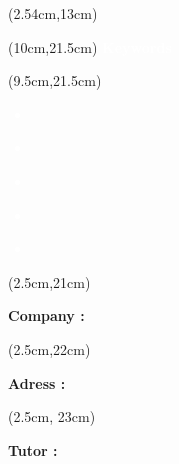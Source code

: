 \begin{titlepage}
    \begin{textblock*}{16cm}(2.54cm,13cm)
        {
            \normalsize
            \makeatletter
            \setlength{\parindent}{0pt}
            \titletext
        }
    \end{textblock*}

    \begin{textblock*}{9cm}(10cm,21.5cm)
        \normalsize
        \centering
        \textbf{\textcolor{white}{Keywords}}
    \end{textblock*}

    \begin{textblock*}{10cm}(9.5cm,21.5cm)
        \small
        \textcolor{white}{
            \begin{itemize}[label=\textcolor{white}{\textbullet}]
                \item \textbf{\theKone}
                \item \textbf{\theKtwo}
                \item \textbf{\theKthree}
                \item \textbf{\theKfourth}
                \item \textbf{\theKfive}
            \end{itemize}
        }
    \end{textblock*}

    \begin{textblock*}{6.5cm}(2.5cm,21cm)
        \small
        \raggedright
        \justify
        \textbf{\textcolor{bleuRoiUTT}{Company :} \theEntreprise}
    \end{textblock*}

    \begin{textblock*}{6.5cm}(2.5cm,22cm)
        \small
        \raggedright
        \justify 
        \textbf{\textcolor{bleuRoiUTT}{Adress :} \theLieu}
    \end{textblock*}

    \begin{textblock*}{6.5cm}(2.5cm, 23cm)
        \small
        \raggedright
        \justify
        \textbf{\textcolor{bleuRoiUTT}{Tutor :} \theREntre}
    \end{textblock*}

\end{titlepage}

\clearpage %